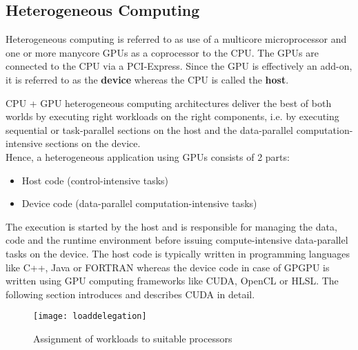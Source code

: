 \documentclass[thesis.tex]{subfiles}
\begin{document}
\subsection{Heterogeneous Computing}
Heterogeneous computing is referred to as use of a multicore microprocessor and one or more manycore GPUs as a coprocessor to the CPU. The GPUs are connected to the CPU via a PCI-Express. Since the GPU is effectively an add-on, it is referred to as the \textbf{device} whereas the CPU is called the \textbf{host}. 

CPU + GPU heterogeneous computing architectures deliver the best of both worlds by executing right workloads on the right components, i.e. by executing sequential or task-parallel sections on the host and the data-parallel computation-intensive sections on the device. \\
Hence, a heterogeneous application using GPUs consists of 2 parts:
\begin{itemize}
	\item Host code (control-intensive tasks)
	\item Device code (data-parallel computation-intensive tasks)
\end{itemize}
The  execution is started by the host and is responsible for managing the data, code and the runtime environment before issuing compute-intensive data-parallel tasks on the device. The host code is typically written in programming languages like C++, Java or FORTRAN whereas the device code in case of GPGPU is written using GPU computing frameworks like CUDA, OpenCL or HLSL. The following section introduces and describes CUDA in detail. 
\begin{figure}[H]
	\centering
	\texttt{[image: loaddelegation]}
	\caption{Assignment of workloads to suitable processors~\cite{profCUDA}}
	\label{fig:loaddelegation}
\end{figure}
\end{document}
